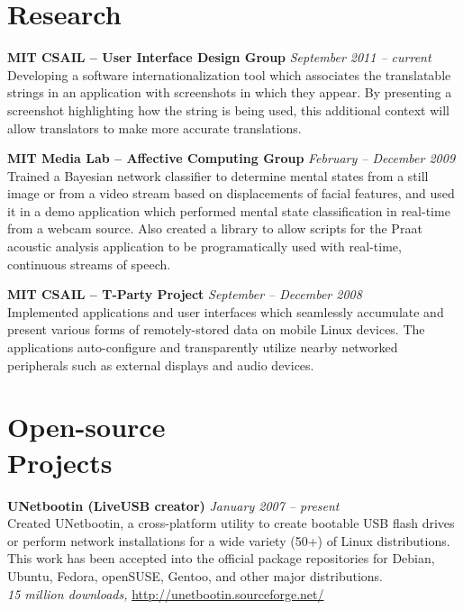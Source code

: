 \documentclass[margin,line]{resume}
\begin{document}
\begin{resume}
\section{\mysidestyle Research}

\textbf{MIT CSAIL -- User Interface Design Group} \hfill \textsl{September 2011 -- current}\\
Developing a software internationalization tool which associates the translatable strings in an application with screenshots in which they appear. By presenting a screenshot highlighting how the string is being used, this additional context will allow translators to make more accurate translations.

\textbf{MIT Media Lab -- Affective Computing Group} \hfill \textsl{February -- December 2009}\\
Trained a Bayesian network classifier to determine mental states from a still image or from a video stream based on displacements of facial features, and used it in a demo application which performed mental state classification in real-time from a webcam source.
Also created a library to allow scripts for the Praat acoustic analysis application to be programatically used with real-time, continuous streams of speech.

\textbf{MIT CSAIL -- T-Party Project} \hfill \textsl{September -- December 2008}\\
Implemented applications and user interfaces which seamlessly accumulate and present various forms of remotely-stored data on mobile Linux devices. The applications auto-configure and transparently utilize nearby networked peripherals such as external displays and audio devices.

\section{\mysidestyle Open-source\\Projects}

\textbf{UNetbootin (LiveUSB creator)} \hfill \textsl{January 2007 -- present}\\
Created UNetbootin, a cross-platform utility to create bootable USB flash drives or perform network installations for a wide variety (50+) of Linux distributions. This work has been accepted into the official package repositories for Debian, Ubuntu, Fedora, openSUSE, Gentoo, and other major distributions. \\
\emph{15 million downloads,} \url{http://unetbootin.sourceforge.net/}


\end{resume}
\end{document}
